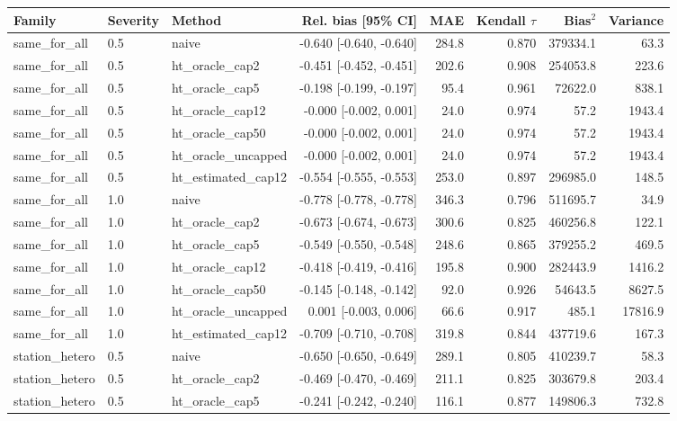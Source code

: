 \begin{tabular}{lllrrrrr}
\toprule
Family & Severity & Method & Rel. bias [95\% CI] & MAE & Kendall $\tau$ & Bias$^2$ & Variance \\
\midrule
same\_for\_all & 0.5 & naive & -0.640 [-0.640, -0.640] & 284.8 & 0.870 & 379334.1 & 63.3 \\
same\_for\_all & 0.5 & ht\_oracle\_cap2 & -0.451 [-0.452, -0.451] & 202.6 & 0.908 & 254053.8 & 223.6 \\
same\_for\_all & 0.5 & ht\_oracle\_cap5 & -0.198 [-0.199, -0.197] & 95.4 & 0.961 & 72622.0 & 838.1 \\
same\_for\_all & 0.5 & ht\_oracle\_cap12 & -0.000 [-0.002, 0.001] & 24.0 & 0.974 & 57.2 & 1943.4 \\
same\_for\_all & 0.5 & ht\_oracle\_cap50 & -0.000 [-0.002, 0.001] & 24.0 & 0.974 & 57.2 & 1943.4 \\
same\_for\_all & 0.5 & ht\_oracle\_uncapped & -0.000 [-0.002, 0.001] & 24.0 & 0.974 & 57.2 & 1943.4 \\
same\_for\_all & 0.5 & ht\_estimated\_cap12 & -0.554 [-0.555, -0.553] & 253.0 & 0.897 & 296985.0 & 148.5 \\
same\_for\_all & 1.0 & naive & -0.778 [-0.778, -0.778] & 346.3 & 0.796 & 511695.7 & 34.9 \\
same\_for\_all & 1.0 & ht\_oracle\_cap2 & -0.673 [-0.674, -0.673] & 300.6 & 0.825 & 460256.8 & 122.1 \\
same\_for\_all & 1.0 & ht\_oracle\_cap5 & -0.549 [-0.550, -0.548] & 248.6 & 0.865 & 379255.2 & 469.5 \\
same\_for\_all & 1.0 & ht\_oracle\_cap12 & -0.418 [-0.419, -0.416] & 195.8 & 0.900 & 282443.9 & 1416.2 \\
same\_for\_all & 1.0 & ht\_oracle\_cap50 & -0.145 [-0.148, -0.142] & 92.0 & 0.926 & 54643.5 & 8627.5 \\
same\_for\_all & 1.0 & ht\_oracle\_uncapped & 0.001 [-0.003, 0.006] & 66.6 & 0.917 & 485.1 & 17816.9 \\
same\_for\_all & 1.0 & ht\_estimated\_cap12 & -0.709 [-0.710, -0.708] & 319.8 & 0.844 & 437719.6 & 167.3 \\
station\_hetero & 0.5 & naive & -0.650 [-0.650, -0.649] & 289.1 & 0.805 & 410239.7 & 58.3 \\
station\_hetero & 0.5 & ht\_oracle\_cap2 & -0.469 [-0.470, -0.469] & 211.1 & 0.825 & 303679.8 & 203.4 \\
station\_hetero & 0.5 & ht\_oracle\_cap5 & -0.241 [-0.242, -0.240] & 116.1 & 0.877 & 149806.3 & 732.8 \\

\end{tabular}

